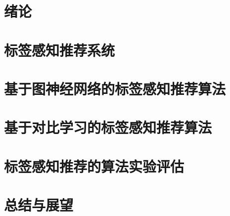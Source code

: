 \titlespacing{\chapter}{0pt}{-50pt}{0pt}
\chapter{绪论}
\label{cha:introduce}


\chapter{标签感知推荐系统}
\label{cha:tagrec}


\chapter{基于图神经网络的标签感知推荐算法}
\label{cha:lfgcf}


\chapter{基于对比学习的标签感知推荐算法}
\label{cha:tagcl}


\chapter{标签感知推荐的算法实验评估}  %
\label{cha:ex_demo}

% 

\chapter{总结与展望}
\label{cha:end}
